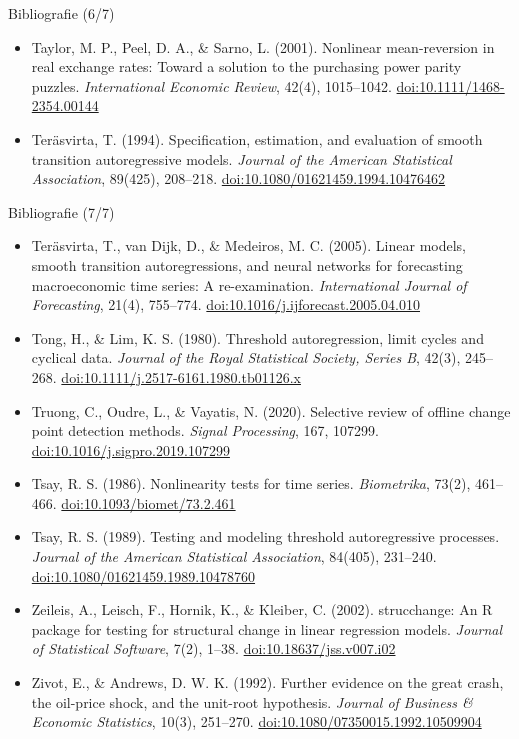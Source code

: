 \begin{frame}{Bibliografie (6/7)}
\begin{itemize}
    \item Taylor, M. P., Peel, D. A., \& Sarno, L. (2001). Nonlinear mean-reversion in real exchange rates: Toward a solution to the purchasing power parity puzzles. \textit{International Economic Review}, 42(4), 1015--1042. \href{https://doi.org/10.1111/1468-2354.00144}{doi:10.1111/1468-2354.00144}
    \item Teräsvirta, T. (1994). Specification, estimation, and evaluation of smooth transition autoregressive models. \textit{Journal of the American Statistical Association}, 89(425), 208--218. \href{https://doi.org/10.1080/01621459.1994.10476462}{doi:10.1080/01621459.1994.10476462}
\end{itemize}
\end{frame}

\begin{frame}{Bibliografie (7/7)}
\itemsize{\tiny}
\begin{itemize}
    \item Teräsvirta, T., van Dijk, D., \& Medeiros, M. C. (2005). Linear models, smooth transition autoregressions, and neural networks for forecasting macroeconomic time series: A re-examination. \textit{International Journal of Forecasting}, 21(4), 755--774. \href{https://doi.org/10.1016/j.ijforecast.2005.04.010}{doi:10.1016/j.ijforecast.2005.04.010}
    \item Tong, H., \& Lim, K. S. (1980). Threshold autoregression, limit cycles and cyclical data. \textit{Journal of the Royal Statistical Society, Series B}, 42(3), 245--268. \href{https://doi.org/10.1111/j.2517-6161.1980.tb01126.x}{doi:10.1111/j.2517-6161.1980.tb01126.x}
    \item Truong, C., Oudre, L., \& Vayatis, N. (2020). Selective review of offline change point detection methods. \textit{Signal Processing}, 167, 107299. \href{https://doi.org/10.1016/j.sigpro.2019.107299}{doi:10.1016/j.sigpro.2019.107299}
    \item Tsay, R. S. (1986). Nonlinearity tests for time series. \textit{Biometrika}, 73(2), 461--466. \href{https://doi.org/10.1093/biomet/73.2.461}{doi:10.1093/biomet/73.2.461}
    \item Tsay, R. S. (1989). Testing and modeling threshold autoregressive processes. \textit{Journal of the American Statistical Association}, 84(405), 231--240. \href{https://doi.org/10.1080/01621459.1989.10478760}{doi:10.1080/01621459.1989.10478760}
    \item Zeileis, A., Leisch, F., Hornik, K., \& Kleiber, C. (2002). strucchange: An R package for testing for structural change in linear regression models. \textit{Journal of Statistical Software}, 7(2), 1--38. \href{https://doi.org/10.18637/jss.v007.i02}{doi:10.18637/jss.v007.i02}
    \item Zivot, E., \& Andrews, D. W. K. (1992). Further evidence on the great crash, the oil-price shock, and the unit-root hypothesis. \textit{Journal of Business \& Economic Statistics}, 10(3), 251--270. \href{https://doi.org/10.1080/07350015.1992.10509904}{doi:10.1080/07350015.1992.10509904}
\end{itemize}
\end{frame}


